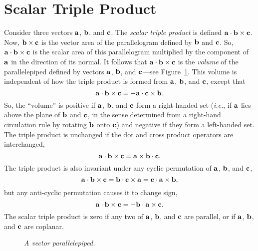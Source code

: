 \section{Scalar Triple Product}\label{sstp}
Consider three vectors ${\bf a}$, ${\bf b}$, and ${\bf c}$. The {\em scalar triple product}\/ is
defined ${\bf a}\cdot {\bf b}\times {\bf c}$. Now, ${\bf b}\times {\bf c}$ is the vector area of
the parallelogram defined by ${\bf b}$ and ${\bf c}$. So, ${\bf a}\cdot {\bf b} \times{\bf c}$
is the scalar area of this parallelogram multiplied by the component of ${\bf a}$ in the direction
of its  normal. It follows that ${\bf a}\cdot {\bf b}\times{\bf c}$ is
the {\em volume}\/ of the parallelepiped defined by vectors ${\bf a}$, ${\bf b}$, and ${\bf c}$---see Figure~\ref{f9a}.
This volume is independent of how the triple product is formed from ${\bf a}$, ${\bf b}$, 
and ${\bf c}$, except that 
\begin{equation}
{\bf a} \cdot {\bf b}\times{\bf c} = - {\bf a} \cdot {\bf c}\times{\bf b}.
\end{equation}
So, the ``volume'' is positive if ${\bf a}$, ${\bf b}$, and ${\bf c}$ form a right-handed set
({\em i.e.}, if ${\bf a}$ lies above the plane of ${\bf b}$ and ${\bf c}$,
in the sense determined from a right-hand circulation rule by rotating
${\bf b}$ onto ${\bf c}$) and negative if they form a left-handed set. 
The triple product is unchanged if the dot and cross product operators are interchanged,
\begin{equation}
{\bf a} \cdot {\bf b}\times{\bf c} = {\bf a} \times{\bf b} \cdot{\bf c}.
\end{equation}
The triple product is also invariant under any cyclic permutation of ${\bf a}$, ${\bf b}$,
and ${\bf c}$,
\begin{equation}
{\bf a} \cdot {\bf b} \times{\bf c} = {\bf b} \cdot {\bf c} \times{\bf a} = 
{\bf c} \cdot {\bf a} \times{\bf b},
\end{equation}
but any anti-cyclic permutation causes it to change sign,
\begin{equation}
{\bf a} \cdot  {\bf b} \times{\bf c} = - {\bf b} \cdot {\bf a} \times{\bf c}.
\end{equation}
The scalar triple product is zero if any
two of ${\bf a}$, ${\bf b}$, and ${\bf c}$ are parallel, or if ${\bf a}$, ${\bf b}$, and ${\bf c}$
are coplanar. 
\begin{figure}
\epsfysize=1.5in
\centerline{}
\caption{\em A vector parallelepiped.}\label{f9a}
\end{figure}


